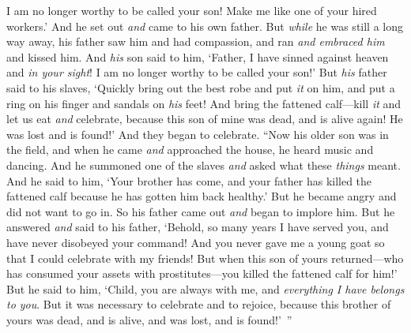 \begin{biblechapter}
\verse I am no longer worthy to be called your son! Make me like one of your hired workers.’
\verse And he set out \textit{and} came to his own father. But \textit{while} he was still a long way away, his father saw him and had compassion, and ran \textit{and embraced him} and kissed him.
\verse And \textit{his} son said to him, ‘Father, I have sinned against heaven and \textit{in your sight}! I am no longer worthy to be called your son!’
\verse But \textit{his} father said to his slaves, ‘Quickly bring out the best robe and put \textit{it} on him, and put a ring on his finger and sandals on \textit{his} feet!
\verse And bring the fattened calf—kill \textit{it} and let us eat \textit{and} celebrate,
\verse because this son of mine was dead, and is alive again! He was lost and is found!’ And they began to celebrate.
\verse “Now his older son was in the field, and when he came \textit{and} approached the house, he heard music and dancing.
\verse And he summoned one of the slaves \textit{and} asked what these \textit{things} meant.
\verse And he said to him, ‘Your brother has come, and your father has killed the fattened calf because he has gotten him back healthy.’
\verse But he became angry and did not want to go in. So his father came out \textit{and} began to implore him.
\verse But he answered \textit{and} said to his father, ‘Behold, so many years I have served you, and have never disobeyed your command! And you never gave me a young goat so that I could celebrate with my friends!
\verse But when this son of yours returned—who has consumed your assets with prostitutes—you killed the fattened calf for him!’
\verse But he said to him, ‘Child, you are always with me, and \textit{everything I have belongs to you}.
\verse But it was necessary to celebrate and to rejoice, because this brother of yours was dead, and is alive, and was lost, and is found!’ ”
\end{biblechapter}

